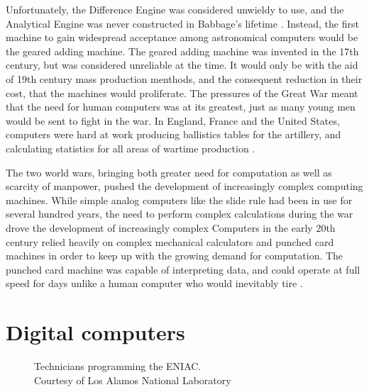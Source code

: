 \documentclass[\rootfolder/main.tex]{subfiles}
\begin{document}
Unfortunately, the Difference Engine was considered unwieldy to use, and the Analytical Engine was never constructed in Babbage's lifetime \cite{babbage1832}.
Instead, the first machine to gain widespread acceptance among astronomical computers would be the geared adding machine.
The geared adding machine was invented in the 17th century, but was considered unreliable at the time.
It would only be with the aid of 19th century mass production menthods, and the consequent reduction in their cost, that the machines would proliferate.
The pressures of the Great War meant that the need for human computers was at its greatest, just as many young men would be sent to fight in the war.
In England, France and the United States, computers were hard at work producing ballistics tables for the artillery, and calculating statistics for all areas of wartime production \cite{grier1955}.

The two world wars, bringing both greater need for computation as well as scarcity of manpower, pushed the development of increasingly complex computing machines.
While simple analog computers like the slide rule had been in use for several hundred years, the need to perform complex calculations during the war drove the development of increasingly complex
Computers in the early 20th century relied heavily on complex mechanical calculators and punched card machines in order to keep up with the growing demand for computation.
The punched card machine was capable of interpreting data, and could operate at full speed for days unlike a human computer who would inevitably tire \cite{carr}.

\section{Digital computers}

\begin{figure}[ht]
    \caption[Technicians programming the ENIAC]
            {Technicians programming the ENIAC. \\ Courtesy of Los Alamos National Laboratory\label{fig:eniac}}
\end{figure}
\end{document}
